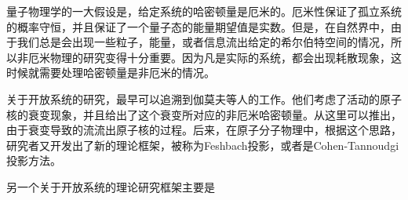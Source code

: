 
量子物理学的一大假设是，给定系统的哈密顿量是厄米的。厄米性保证了孤立系统的概率守恒，并且保证了一个量子态的能量期望值是实数。但是，在自然界中，由于我们总是会出现一些粒子，能量，或者信息流出给定的希尔伯特空间的情况，所以非厄米物理的研究变得十分重要。因为凡是实际的系统，都会出现耗散现象，这时候就需要处理哈密顿量是非厄米的情况。

关于开放系统的研究，最早可以追溯到伽莫夫等人的工作。他们考虑了活动的原子核的衰变现象，并且给出了这个衰变所对应的非厄米哈密顿量。从这里可以推出，由于衰变导致的流流出原子核的过程。后来，在原子分子物理中，根据这个思路，研究者又开发出了新的理论框架，被称为Feshbach投影，或者是Cohen-Tannoudgi投影方法。

另一个关于开放系统的理论研究框架主要是
